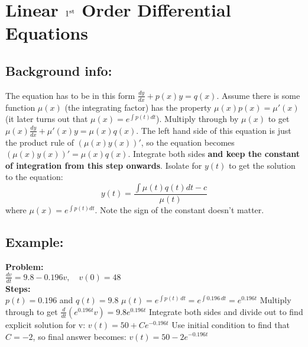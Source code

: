 \documentclass{article}
\begin{document}
\hypertarget{linearSolve}{
  \section*{Linear $1^{\rm st}$ Order Differential Equations}
  \subsection*{Background info:} 
  The equation has to be in this form $\frac{dy}{dx} + p(x)y=q(x)$. Assume there is some function $\mu(x)$ (the integrating factor) has the property $\mu(x) p(x)= \mu'(x)$ (it later turns out that $\mu(x) = e^{\int p(t)dt}$). \newline
  Multiply through by $\mu(x)$ to get $\mu(x)\frac{dy}{dx} + \mu'(x)y=\mu(x)q(x)$. The left hand side of this equation is just the product rule of $(\mu(x)y(x))'$, so the equation becomes $(\mu(x)y(x))' = \mu(x)q(x)$. Integrate both sides \textbf{and keep the constant of integration from this step onwards}. \newline
  Isolate for $y(t)$ to get the solution to the equation:
\begin{equation*}
y(t) = \frac{\int \mu(t)q(t) dt - c}{\mu(t)}
\end{equation*}
where $\mu(x) = e^{\int p(t)dt}$. Note the sign of the constant doesn't matter.
  \subsection*{Example:}
  \textbf{Problem:}\\[6pt]
  $\frac{dv}{dt} = 9.8 - 0.196v, \quad v(0) = 48$ \\[6pt]
  \textbf{Steps:}\\[6pt]
  $p(t) = 0.196$ and $q(t) = 9.8$
	$\mu(t) = e^{\int p(t) \, dt} = e^{\int 0.196 \, dt} = e^{0.196t}$\newline
	Multiply through to get $\frac{d}{dt} (e^{0.196t} v) = 9.8e^{0.196t}$\newline
	Integrate both sides and divide out to find explicit solution for v: $v(t) = 50 + Ce^{-0.196t}$ \newline
	Use initial condition to find that $C = -2$, so final answer becomes: $v(t) = 50 - 2e^{-0.196t}$
}
\end{document}
